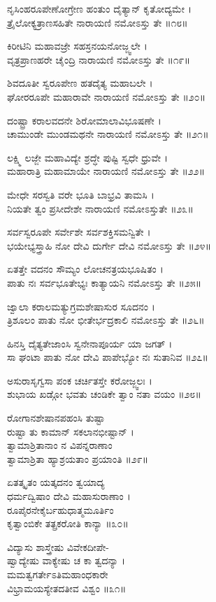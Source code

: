 ನೃಸಿಂಹರೂಪೇಣೋಗ್ರೇಣ ಹಂತುಂ ದೈತ್ಯಾನ್ ಕೃತೋದ್ಯಮೇ ।\\
ತ್ರೈಲೋಕ್ಯತ್ರಾಣಸಹಿತೇ ನಾರಾಯಣಿ ನಮೋಽಸ್ತು ತೇ ॥೧೮॥

ಕಿರೀಟಿನಿ ಮಹಾವಜ್ರೇ ಸಹಸ್ರನಯನೋಜ್ಜ್ವಲೇ ।\\
ವೃತ್ರಪ್ರಾಣಹರೇ ಚೈಂದ್ರಿ ನಾರಾಯಣಿ ನಮೋಽಸ್ತು ತೇ ॥೧೯॥

ಶಿವದೂತೀ ಸ್ವರೂಪೇಣ ಹತದೈತ್ಯ ಮಹಾಬಲೇ ।\\
ಘೋರರೂಪೇ ಮಹಾರಾವೇ ನಾರಾಯಣಿ ನಮೋಽಸ್ತು ತೇ ॥೨೦॥

ದಂಷ್ಟ್ರಾ ಕರಾಲವದನೇ ಶಿರೋಮಾಲಾವಿಭೂಷಣೇ ।\\
ಚಾಮುಂಡೇ ಮುಂಡಮಥನೇ ನಾರಾಯಣಿ ನಮೋಽಸ್ತು ತೇ ॥೨೧॥

ಲಕ್ಷ್ಮಿ ಲಜ್ಜೇ ಮಹಾವಿದ್ಯೇ ಶ್ರದ್ಧೇ ಪುಷ್ಟಿ ಸ್ವಧೇ ಧ್ರುವೇ ।\\
ಮಹಾರಾತ್ರಿ ಮಹಾಮಾಯೇ ನಾರಾಯಣಿ ನಮೋಽಸ್ತು ತೇ ॥೨೨॥

ಮೇಧೇ ಸರಸ್ವತಿ ವರೇ ಭೂತಿ ಬಾಭ್ರವಿ ತಾಮಸಿ ।\\
ನಿಯತೇ ತ್ವಂ ಪ್ರಸೀದೇಶೇ ನಾರಾಯಣಿ ನಮೋಽಸ್ತುತೇ ॥೨೩॥

ಸರ್ವಸ್ವರೂಪೇ ಸರ್ವೇಶೇ ಸರ್ವಶಕ್ತಿಸಮನ್ವಿತೇ ।\\
ಭಯೇಭ್ಯಸ್ತ್ರಾಹಿ ನೋ ದೇವಿ ದುರ್ಗೇ ದೇವಿ ನಮೋಽಸ್ತು ತೇ ॥೨೪॥

ಏತತ್ತೇ ವದನಂ ಸೌಮ್ಯಂ ಲೋಚನತ್ರಯಭೂಷಿತಂ ।\\
ಪಾತು ನಃ ಸರ್ವಭೂತೇಭ್ಯಃ ಕಾತ್ಯಾಯನಿ ನಮೋಽಸ್ತು ತೇ ॥೨೫॥

ಜ್ವಾಲಾ ಕರಾಲಮತ್ಯುಗ್ರಮಶೇಷಾಸುರ ಸೂದನಂ ।\\
ತ್ರಿಶೂಲಂ ಪಾತು ನೋ ಭೀತೇರ್ಭದ್ರಕಾಲಿ ನಮೋಽಸ್ತು ತೇ ॥೨೬॥

ಹಿನಸ್ತಿ ದೈತ್ಯತೇಜಾಂಸಿ ಸ್ವನೇನಾಪೂರ್ಯ ಯಾ ಜಗತ್ ।\\
ಸಾ ಘಂಟಾ ಪಾತು ನೋ ದೇವಿ ಪಾಪೇಭ್ಯೋ ನಃ ಸುತಾನಿವ ॥೨೭॥

ಅಸುರಾಸೃಗ್ವಸಾ ಪಂಕ ಚರ್ಚಿತಸ್ತೇ ಕರೋಜ್ಜ್ವಲಃ ।\\
ಶುಭಾಯ ಖಡ್ಗೋ ಭವತು ಚಂಡಿಕೇ ತ್ವಾಂ ನತಾ ವಯಂ ॥೨೮॥

ರೋಗಾನಶೇಷಾನಪಹಂಸಿ ತುಷ್ಟಾ\\
        ರುಷ್ಟಾ ತು ಕಾಮಾನ್ ಸಕಲಾನಭೀಷ್ಟಾನ್ ।\\
ತ್ವಾಮಾಶ್ರಿತಾನಾಂ ನ ವಿಪನ್ನರಾಣಾಂ\\
        ತ್ವಾಮಾಶ್ರಿತಾ ಹ್ಯಾಶ್ರಯತಾಂ ಪ್ರಯಾಂತಿ ॥೨೯॥

ಏತತ್ಕೃತಂ ಯತ್ಕದನಂ ತ್ವಯಾದ್ಯ\\
        ಧರ್ಮದ್ವಿಷಾಂ ದೇವಿ ಮಹಾಸುರಾಣಾಂ ।\\
ರೂಪೈರನೇಕೈರ್ಬಹುಧಾತ್ಮಮೂರ್ತಿಂ\\
        ಕೃತ್ವಾಂಬಿಕೇ ತತ್ಪ್ರಕರೋತಿ ಕಾನ್ಯಾ ॥೩೦॥

ವಿದ್ಯಾಸು ಶಾಸ್ತ್ರೇಷು ವಿವೇಕದೀಪೇ-\\
      ಷ್ವಾದ್ಯೇಷು ವಾಕ್ಯೇಷು ಚ ಕಾ ತ್ವದನ್ಯಾ ।\\
ಮಮತ್ವಗರ್ತೇಽತಿಮಹಾಂಧಕಾರೇ\\
      ವಿಭ್ರಾಮಯಸ್ಯೇತದತೀವ ವಿಶ್ವಂ ॥೩೧॥

